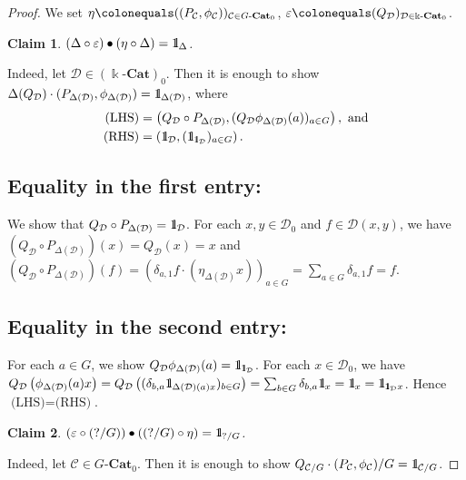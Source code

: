 \documentclass{surv-l}
\numberwithin{equation}{chapter}
\numberwithin{figure}{chapter}
\theoremstyle{plain}
\newtheorem{clm}{Claim}
\theoremstyle{definition}
\theoremstyle{remark}
\newcommand{\id}{1\kern-.25em{\text{{\rm l}}}}
\newcommand{\kCat}{\Bbbk\text{-}\mathbf{Cat}}
\newcommand{\GCat}{G\text{-}\mathbf{Cat}}
\begin{document}
\begin{proof}
We set $\eta\colonequals ((P_{\mathcal{C}}, \phi_{\mathcal{C}}))_{{\mathcal{C}} \in \GCat_0}$,
$\varepsilon\colonequals  (Q_{{\mathcal{D}}})_{{\mathcal{D}} \in \kCat_0}$.

\setcounter{clm}{0}
\begin{clm}
$(\Delta\circ \varepsilon)\bullet (\eta \circ \Delta) = \id_{\Delta}$.
\end{clm}
Indeed,
let ${\mathcal{D}} \in (\kCat)_0$.
Then it is enough to show
$\Delta(Q_{{\mathcal{D}}}) \cdot (P_{\Delta({\mathcal{D}})}, \phi_{\Delta({\mathcal{D}})}) = \id_{\Delta({\mathcal{D}})}$, where
\begin{equation*}
\begin{aligned}
\text{(LHS)}
 &=\left(Q_{{\mathcal{D}}}\circ P_{\Delta({\mathcal{D}})}, (Q_{{\mathcal{D}}}\phi_{\Delta({\mathcal{D}})}(a))_{a\in G}\right)
 , \text{ and}\\
\text{(RHS)}
 &=\left(\id_{{\mathcal{D}}}, (\id_{\id_{{\mathcal{D}}}})_{a\in G}\right).
\end{aligned}
 \end{equation*}

\subsection*{Equality in the first entry:}
We show that $Q_{{\mathcal{D}}}\circ P_{\Delta({\mathcal{D}})} = \id_{{\mathcal{D}}}$.
For each $x, y \in {\mathcal{D}}_0$ and $f\in {\mathcal{D}}(x, y)$, we have
$(Q_{{\mathcal{D}}}\circ P_{\Delta({\mathcal{D}})})(x) = Q_{{\mathcal{D}}}(x) = x$ and
$(Q_{{\mathcal{D}}}\circ P_{\Delta({\mathcal{D}})})(f) = (\delta_{a, 1}f \cdot (\eta_{\Delta({\mathcal{D}})}x))_{a\in G} =
\sum_{a \in G}\delta_{a, 1}f = f$.

\subsection*{Equality in the second entry:}
For each $a \in G$, we show
$Q_{{\mathcal{D}}}\phi_{\Delta({\mathcal{D}})}(a) = \id_{\id_{{\mathcal{D}}}}$.
For each $x \in {\mathcal{D}}_0$, we have
$Q_{{\mathcal{D}}}\left(\phi_{\Delta({\mathcal{D}})}(a)x\right)
= Q_{{\mathcal{D}}}\left((\delta_{b,a}\id_{\Delta({\mathcal{D}})(a)x})_{b\in G}\right)
=\sum_{b\in G}\delta_{b,a}\id_x = \id_x = \id_{\id_{{\mathcal{D}}}x}$.
Hence $\text{(LHS)}= \text{(RHS)}$.

\begin{clm}
$(\varepsilon \circ (?/G))\bullet ((?/G) \circ \eta) = \id_{?/G}$.
\end{clm}
Indeed, let ${\mathcal{C}} \in \GCat_0$.  Then it is enough to show
$Q_{{\mathcal{C}}/G}\cdot (P_{\mathcal{C}}, \phi_{\mathcal{C}})/G = \id_{{\mathcal{C}}/G}$.


\end{proof}
\end{document}
